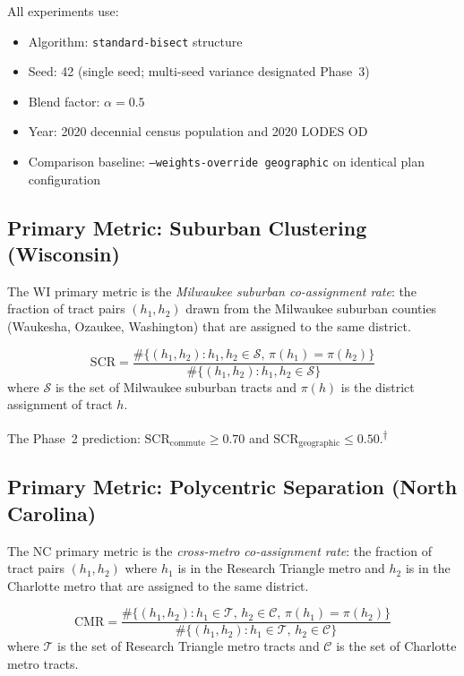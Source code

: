 All experiments use:
\begin{itemize}
  \item Algorithm: \texttt{standard-bisect} structure
  \item Seed: 42 (single seed; multi-seed variance designated Phase~3)
  \item Blend factor: $\alpha = 0.5$
  \item Year: 2020 decennial census population and 2020 LODES OD
  \item Comparison baseline: \texttt{--weights-override geographic}
    on identical plan configuration
\end{itemize}

\subsection{Primary Metric: Suburban Clustering (Wisconsin)}

The WI primary metric is the \emph{Milwaukee suburban co-assignment rate}:
the fraction of tract pairs $(h_1, h_2)$ drawn from the Milwaukee
suburban counties (Waukesha, Ozaukee, Washington) that are assigned to
the same district.

\begin{equation}
  \mathrm{SCR} = \frac{\#\{(h_1, h_2) : h_1, h_2 \in \mathcal{S},\, \pi(h_1) = \pi(h_2)\}}
  {\#\{(h_1, h_2) : h_1, h_2 \in \mathcal{S}\}}
  \label{eq:scr}
\end{equation}
where $\mathcal{S}$ is the set of Milwaukee suburban tracts and
$\pi(h)$ is the district assignment of tract $h$.

The Phase~2 prediction:
$\mathrm{SCR}_{\mathrm{commute}} \geq 0.70$ and
$\mathrm{SCR}_{\mathrm{geographic}} \leq 0.50$.\textsuperscript{$\dagger$}

\subsection{Primary Metric: Polycentric Separation (North Carolina)}

The NC primary metric is the \emph{cross-metro co-assignment rate}:
the fraction of tract pairs $(h_1, h_2)$ where $h_1$ is in the
Research Triangle metro and $h_2$ is in the Charlotte metro that are
assigned to the same district.

\begin{equation}
  \mathrm{CMR} = \frac{\#\{(h_1, h_2) : h_1 \in \mathcal{T},\, h_2 \in \mathcal{C},\, \pi(h_1) = \pi(h_2)\}}
  {\#\{(h_1, h_2) : h_1 \in \mathcal{T},\, h_2 \in \mathcal{C}\}}
  \label{eq:cmr}
\end{equation}
where $\mathcal{T}$ is the set of Research Triangle metro tracts and
$\mathcal{C}$ is the set of Charlotte metro tracts.

